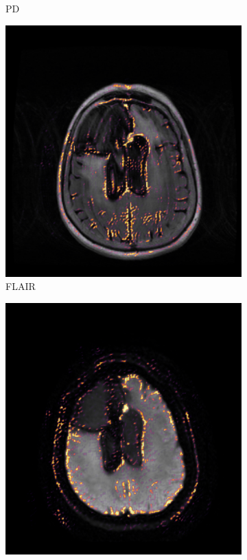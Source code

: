 \begin{figure}[htbp]
\begin{subfigure}[t]{\figexamplewidth}
        \caption{\gls{PD}}\label{fig:PDwCam}
    \end{subfigure}


    \begin{subfigure}[t]{\figexamplewidth}
        \centering
        \includegraphics[trim={0.5cm 0cm 0.5cm 1cm}, clip,width=\textwidth]{Figures/FLAIR_saliency}
        \caption{\gls{FLAIR}}\label{fig:FLAIRCam}
    \end{subfigure}
    \begin{subfigure}[t]{\figexamplewidth}
        \centering
        \includegraphics[trim={0.5cm 0cm 0.5cm 1cm}, clip,width=\textwidth]{Figures/DWI_saliency}

\end{subfigure}
\end{figure}
